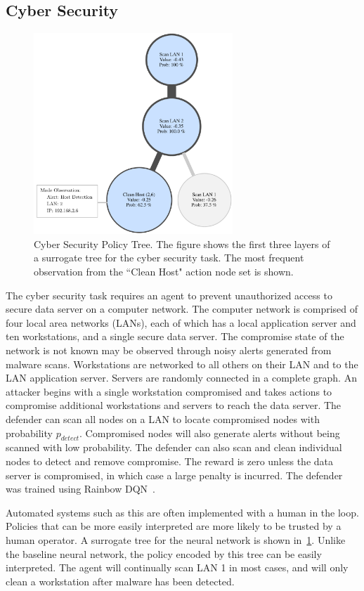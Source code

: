 \documentclass[letterpaper]{article} %
\begin{document}
\subsection{Cyber Security}
\begin{figure}[t]
\centering
\includegraphics[width=0.891\columnwidth,height=2.98in ]{figs/cyber_tree.pdf}
\caption{Cyber Security Policy Tree. The figure shows the first three layers of a surrogate tree for the cyber security task. The most frequent observation from the ``Clean Host" action node set is shown.}
\label{fig: cyber tree}
\end{figure}
The cyber security task requires an agent to prevent unauthorized access to secure data server on a computer network.
The computer network is comprised of four local area networks (LANs), each of which has a local application server and ten workstations, and a single secure data server.
The compromise state of the network is not known may be observed through noisy alerts generated from malware scans.
Workstations are networked to all others on their LAN and to the LAN application server.
Servers are randomly connected in a complete graph.
An attacker begins with a single workstation compromised and takes actions to compromise additional workstations and servers to reach the data server.  The defender can scan all nodes on a LAN to locate compromised nodes with probability $p_{detect}$.
Compromised nodes will also generate alerts without being scanned with low probability.
The defender can also scan and clean individual nodes to detect and remove compromise.
The reward is zero unless the data server is compromised, in which case a large penalty is incurred.
The defender was trained using Rainbow DQN~\cite{hessel2018}.

Automated systems such as this are often implemented with a human in the loop.
Policies that can be more easily interpreted are more likely to be trusted by a human operator.
A surrogate tree for the neural network is shown in~\cref{fig: cyber tree}.
Unlike the baseline neural network, the policy encoded by this tree can be easily interpreted.
The agent will continually scan LAN 1 in most cases, and will only clean a workstation after malware has been detected.
\end{document}
